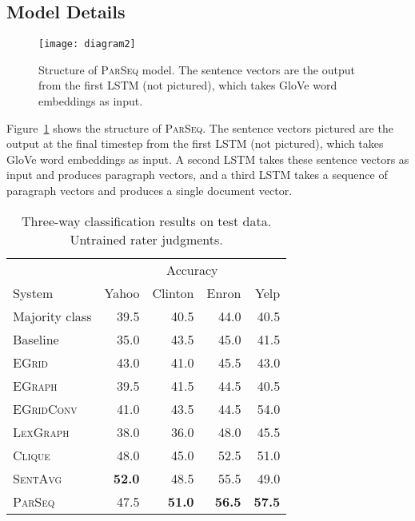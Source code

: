 \documentclass[11pt,a4paper]{article}
\newcommand \egrid{\textsc{EGrid}\xspace}
\newcommand \egraph{\textsc{EGraph}\xspace}
\newcommand \lexgraph{\textsc{LexGraph}\xspace}
\newcommand \parseq{\textsc{ParSeq}\xspace}
\newcommand \clique{\textsc{Clique}\xspace}
\newcommand \sentavg{\textsc{SentAvg}\xspace}
\newcommand \egridconv{\textsc{EGridConv}\xspace}
\begin{document}
\subsection{Model Details}

\begin{figure}[h]
    \centering
    \texttt{[image: diagram2]}
\caption{Structure of \parseq model. The sentence vectors are the output from the first LSTM (not pictured), which takes GloVe word embeddings as input.}
    \label{fig:model_diagram}
\end{figure}

Figure~\ref{fig:model_diagram} shows the structure of \parseq. The sentence vectors pictured are the output at the final timestep from the first LSTM (not pictured), which takes GloVe word embeddings as input. A second LSTM takes these sentence vectors as input and produces paragraph vectors, and a third LSTM takes a sequence of paragraph vectors and produces a single document vector.


\begin{table}
\begin{center}
 \begin{small}
\begin{tabular}{lrrrr}
	\toprule
    & \multicolumn{4}{c}{Accuracy} \\
	System & Yahoo & Clinton & Enron & Yelp \\	
	\midrule
    Majority class & 39.5 & 40.5 & 44.0 & 40.5 \\
    Baseline & 35.0 & 43.5 & 45.0 & 41.5 \\ 
    \midrule
	\egrid & 43.0 & 41.0 & 45.5 & 43.0 \\
    \egraph & 39.5 & 41.5 & 44.5 & 40.5 \\
	\egridconv & 41.0 & 43.5 & 44.5 & 54.0 \\
    \lexgraph & 38.0 & 36.0 & 48.0 & 45.5 \\
    \clique & 48.0 & 45.0 & 52.5 & 51.0 \\
    \sentavg & \textbf{52.0} & 48.5 & 55.5 & 49.0 \\	
    \parseq & 47.5 & \textbf{51.0} & \textbf{56.5} & \textbf{57.5} \\
	\bottomrule
\end{tabular}
 \end{small}
\caption{Three-way classification results on test data. Untrained rater judgments.}
\label{tab:3class_test_mturk}
\end{center}
\end{table}
\end{document}

